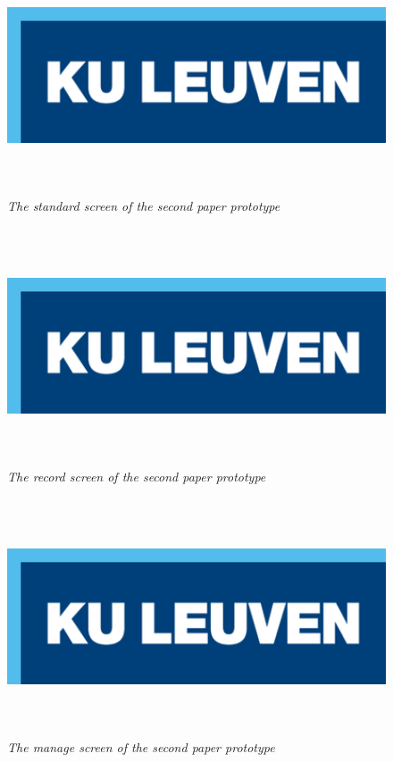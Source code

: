 \begin{figure}[H]
	\begin{center}
		\includegraphics[width=12.5cm, height=7cm]{KUL.png}
		\caption{\emph{The standard screen of the second paper prototype}}
		\label{The standard screen of the second paper prototype}
	\end{center}
\end{figure}

\begin{figure}[H]
	\begin{center}
		\includegraphics[width=12.5cm, height=7cm]{KUL.png}
		\caption{\emph{The record screen of the second paper prototype}}
		\label{The first paper prototype}
	\end{center}
\end{figure}

\begin{figure}[H]
	\begin{center}
		\includegraphics[width=12.5cm, height=7cm]{KUL.png}
		\caption{\emph{The manage screen of the second paper prototype}}
		\label{The first paper prototype}
	\end{center}
\end{figure}